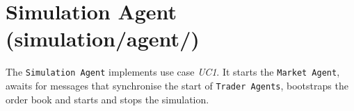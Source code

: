 \section{Simulation Agent (simulation/agent/)}
The \texttt{Simulation Agent} implements use case \textit{UC1}. It starts the \texttt{Market Agent}, awaits for messages that synchronise the start of \texttt{Trader Agents}, bootstraps the order book and starts and stops the simulation.